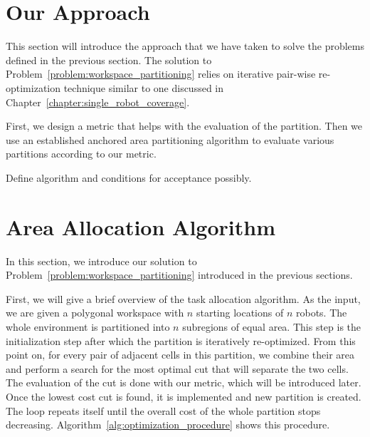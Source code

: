 \documentclass[../main.tex]{subfiles}
\begin{document}
\section{Our Approach}

This section will introduce the approach that we have taken to solve the problems defined in the previous section. The solution to Problem~\ref{problem:workspace_partitioning} relies on iterative pair-wise re-optimization technique similar to one discussed in Chapter~\ref{chapter:single_robot_coverage}.

First, we design a metric that helps with the evaluation of the partition. Then we use an established anchored area partitioning algorithm to evaluate various partitions according to our metric. 

Define algorithm and conditions for acceptance possibly.

\section{Area Allocation Algorithm}
\label{sec:area_allocation_algo}
In this section, we introduce our solution to Problem~\ref{problem:workspace_partitioning} introduced in the previous sections.

First, we will give a brief overview of the task allocation algorithm. As the input, we are given a polygonal workspace with $n$ starting locations of $n$ robots. The whole environment is partitioned into $n$ subregions of equal area. This step is the initialization step after which the partition is iteratively re-optimized. From this point on, for every pair of adjacent cells in this partition, we combine their area and perform a search for the most optimal cut that will separate the two cells. The evaluation of the cut is done with our metric, which will be introduced later. Once the lowest cost cut is found, it is implemented and new partition is created. The loop repeats itself until the overall cost of the whole partition stops decreasing. Algorithm~\ref{alg:optimization_procedure} shows this procedure.
\end{document}
